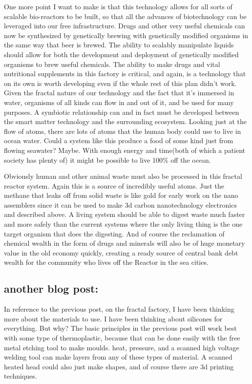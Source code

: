 One more point I want to make is that this technology allows for all
sorts of scalable bio-reactors to be built, so that all the advances of
biotechnology can be leveraged into our free infrastructure. Drugs and
other very useful chemicals can now be synthesized by genetically
brewing with genetically modified organisms in the same way that beer is
brewed. The ability to scalably manipulate liquids should allow for both
the development and deployment of genetically modified organisms to brew
useful chemicals. The ability to make drugs and vital nutritional
supplements in this factory is critical, and again, is a technology that
on its own is worth developing even if the whole rest of this plan
didn't work. Given the fractal nature of our technology and the fact
that it's immersed in water, organisms of all kinds can flow in and out
of it, and be used for many purposes. A symbiotic relationship can and
in fact must be developed between the smart matter technology and the
surrounding ecosystem. Looking just at the flow of atoms, there are lots
of atoms that the human body could use to live in ocean water. Could a
system like this produce a food of some kind just from flowing seawater?
Maybe. With enough energy and time(both of which a patient society has
plenty of) it might be possible to live 100\% off the ocean.

Obviously human and other animal waste must also be processed in this
fractal reactor system. Again this is a source of incredibly useful
atoms. Just the methane that leaks off from solid waste is like gold for
early work on the nano assemblers since it can be used to make 3d carbon
nanotechnology electronics and described above. A living system should
be able to digest waste much faster and more safely than the current
systems where the only living thing is the one target organism that does
the digesting. And of course the reclamation of chemical wealth in the
form of drugs and minerals will also be of huge monetary value in the
old economy quickly, creating a ready source of central bank debt wealth
for the community who lives off the Reactor in the sea cities.

\subsection{another blog post:}\label{another-blog-post}

In reference to the previous post, on the fractal factory, I have been
thinking more about the materials to use. I have been thinking about
silicones for everything. But why? The basic principles in the previous
post will work best with some type of thermoplastic, because that can be
done easily with the free metal etching tool to make moulds. heat,
pressure, and a scanned high voltage welding tool can make layers from
any of these types of material. A scanned heated head could also just
make shapes, and of course there are 3d printing techniques.

